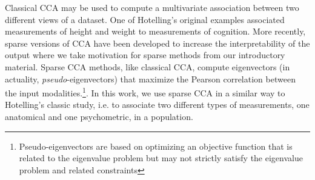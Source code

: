 \documentclass[preprint,authoryear,12pt]{elsarticle}
\begin{document}
Classical CCA may be used to compute a multivariate association between two different views of a dataset.  One of Hotelling's original examples associated measurements of height and weight to measurements of cognition.  More recently, sparse versions of CCA have been developed to increase the interpretability of the output where we take motivation for sparse methods from our introductory material.  Sparse CCA methods, like classical CCA, compute eigenvectors (in actuality, {\em pseudo}-eigenvectors) that maximize the Pearson correlation between the input modalities.\footnote{Pseudo-eigenvectors are based on optimizing an objective function that is related to the eigenvalue problem but may not strictly satisfy the eigenvalue problem and related constraints}.  In this work, we use sparse CCA in a similar way to Hotelling's classic study, i.e. to associate two different types of measurements, one anatomical and one psychometric, in a population.
\end{document}
